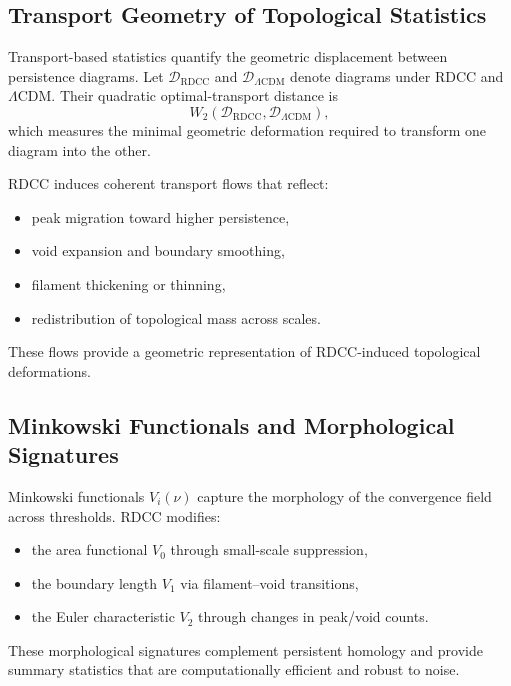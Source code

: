 \documentclass[11pt,a4paper]{article}
\begin{document}
\subsection{Transport Geometry of Topological Statistics}

Transport-based statistics quantify the geometric displacement between
persistence diagrams. Let $\mathcal{D}_{\mathrm{RDCC}}$ and
$\mathcal{D}_{\Lambda\mathrm{CDM}}$ denote diagrams under RDCC and
$\Lambda$CDM. Their quadratic optimal-transport distance is
\begin{equation}
    W_{2}\!\left(
        \mathcal{D}_{\mathrm{RDCC}},
        \mathcal{D}_{\Lambda\mathrm{CDM}}
    \right),
\end{equation}
which measures the minimal geometric deformation required to transform one
diagram into the other.

RDCC induces coherent transport flows that reflect:

\begin{itemize}
    \item peak migration toward higher persistence,
    \item void expansion and boundary smoothing,
    \item filament thickening or thinning,
    \item redistribution of topological mass across scales.
\end{itemize}

These flows provide a geometric representation of RDCC-induced topological
deformations.

\subsection{Minkowski Functionals and Morphological Signatures}

Minkowski functionals $V_{i}(\nu)$ capture the morphology of the convergence
field across thresholds. RDCC modifies:

\begin{itemize}
    \item the area functional $V_{0}$ through small-scale suppression,
    \item the boundary length $V_{1}$ via filament--void transitions,
    \item the Euler characteristic $V_{2}$ through changes in peak/void counts.
\end{itemize}

These morphological signatures complement persistent homology and provide
summary statistics that are computationally efficient and robust to noise.
\end{document}
